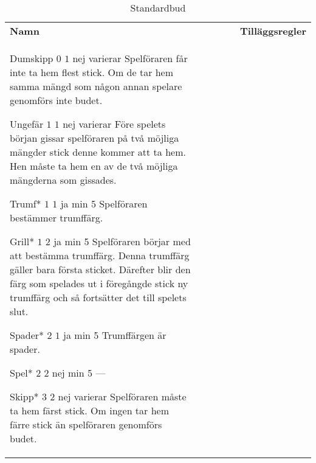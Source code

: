 %
%
%

\begin{table}
	\caption{Standardbud}\label{tab:standardBids}
	\begin{center}
		\begin{tabularx}{\textwidth}{lcccc|X}
				\textbf{Namn} &
				\rotccw{\textbf{Värde}} &
				\rotccw{\textbf{Poäng}} &
				\rotccw{\textbf{Trumf}} &
				\rotccw{\textbf{Stick}} &
				\textbf{Tilläggsregler}
				\\[-3ex]

				\standardBidItem%
				{Dumskipp}
				{$0$}
				{$1$}
				{nej}
				{varierar}
				{%
					Spelföraren får inte ta hem flest stick. Om de tar hem samma mängd som någon annan spelare genomförs inte budet.
				}

				\standardBidItem%
				{Ungefär}
				{$1$}
				{$1$}
				{nej}
				{varierar}
				{%
					Före spelets början gissar spelföraren på två möjliga mängder stick denne kommer att ta hem. Hen måste ta hem en av de två möjliga mängderna som gissades.
				}

				\standardBidItem%
				{Trumf*}
				{$1$}
				{$1$}
				{ja}
				{min 5}
				{%
					Spelföraren bestämmer trumffärg.
				}

				\standardBidItem%
				{Grill*}
				{$1$}
				{$2$}
				{ja}
				{min 5}
				{%
					Spelföraren börjar med att bestämma trumffärg. Denna trumffärg gäller bara första sticket. Därefter blir den färg som spelades ut i föregångde stick ny trumffärg och så fortsätter det till spelets slut.
				}
				
				\standardBidItem%
				{Spader*}
				{$2$}
				{$1$}
				{ja}
				{min 5}
				{%
					Trumffärgen är spader.
				}

				\standardBidItem%
				{Spel*}
				{$2$}
				{$2$}
				{nej}
				{min 5}
				{%
					---
				}

				\standardBidItem%
				{Skipp*}
				{$3$}
				{$2$}
				{nej}
				{varierar}
				{%
					Spelföraren måste ta hem färst stick. Om ingen tar hem färre stick än spelföraren genomförs budet.
				}


\end{tabularx}
\end{center}
\end{table}

